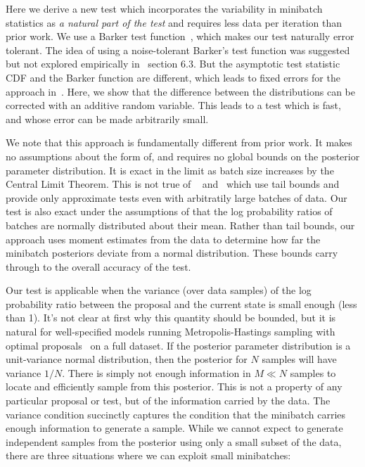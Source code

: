 \documentclass[letterpaper]{article}
\begin{document}
Here we derive a new test which incorporates the variability in minibatch
statistics as {\em a natural part of the test} and requires less data per
iteration than prior work. We use a Barker test function~\citep{Barker65}, which
makes our test naturally error tolerant. The idea of using a noise-tolerant
Barker's test function was suggested but not explored empirically
in~\citep{TallData16} section 6.3. But the asymptotic test statistic CDF and the
Barker function are different, which leads to fixed errors for the approach
in~\citep{TallData16}. Here, we show that the difference between the
distributions can be corrected with an additive random variable. This leads to a
test which is fast, and whose error can be made arbitrarily small.

We note that this approach is fundamentally different from prior
work. It makes no assumptions about the form of, and requires no global bounds on the
posterior parameter distribution. It is exact in the
limit as batch size increases by the Central Limit Theorem. This is
not true of ~\citep{cutting_mh_2014} and~\citep{icml2014c1_bardenet14}
which use tail bounds and provide only approximate tests even with
arbitratily large batches of data. Our test is also exact under the
assumptions of \citep{cutting_mh_2014} that the log probability ratios
of batches are normally distributed about their mean.  Rather
than tail bounds, our approach uses moment estimates from the data to
determine how far the minibatch posteriors deviate from a normal
distribution.  These bounds carry through to the overall accuracy of
the test.

Our test is applicable when the variance (over data samples) of the
log probability ratio between the proposal and the current state is small
enough (less than 1). It's not clear at first why this quantity should
be bounded, but it is natural for well-specified models running
Metropolis-Hastings sampling with optimal
proposals~\citep{OptimalScaling01} on a full dataset. If the posterior
parameter distribution is a unit-variance normal distribution, then
the posterior for $N$ samples will have variance $1/N$. There is
simply not enough information in $M \ll N$ samples to locate and
efficiently sample from this posterior. This is not a property of any
particular proposal or test, but of the information carried by the
data. The variance condition succinctly captures the condition that
the minibatch carries enough information to generate a sample.  While
we cannot expect to generate independent samples from the posterior
using only a small subset of the data, there are three situations
where we can exploit small minibatches:
\end{document}
